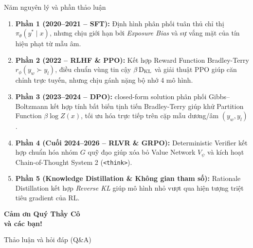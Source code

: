 \begin{frame}{Năm nguyên lý và phần thảo luận}
  \footnotesize
  \begin{enumerate}\setlength{\itemsep}{4pt}
    \item \textbf{Phần 1 (2020--2021 -- SFT):} Định hình phân phối tuân thủ chỉ thị $\pi_\theta(y^* \mid x)$, nhưng chịu giới hạn bởi \textit{Exposure Bias} và sự vắng mặt của tín hiệu phạt từ mẫu âm.
    \item \textbf{Phần 2 (2022 -- RLHF \& PPO):} Kết hợp Reward Function Bradley-Terry $r_\phi(y_w \succ y_l)$, điều chuẩn vùng tin cậy $\beta \operatorname{D_{\mathrm{KL}}}$ và giải thuật PPO giúp căn chỉnh trực tuyến, nhưng chịu gánh nặng bộ nhớ 4 mô hình.
    \item \textbf{Phần 3 (2023--2024 -- DPO):} closed-form solution phân phối Gibbs--Boltzmann kết hợp tính bất biến tịnh tiến Bradley-Terry giúp khử Partition Function $\beta \log Z(x)$, tối ưu hóa trực tiếp trên cặp mẫu dương/âm $(y_w, y_l)$.
    \item \textbf{Phần 4 (Cuối 2024--2026 -- RLVR \& GRPO):} Deterministic Verifier kết hợp chuẩn hóa nhóm $G$ quỹ đạo giúp xóa bỏ Value Network $V_\psi$ và kích hoạt Chain-of-Thought System 2 (\texttt{<think>}).
    \item \textbf{Phần 5 (Knowledge Distillation \& Không gian tham số):} Rationale Distillation kết hợp \textit{Reverse KL} giúp mô hình nhỏ vượt qua hiện tượng triệt tiêu gradient của RL.
  \end{enumerate}
  \par\vspace{0pt}
\end{frame}

\begin{frame}[plain]
  \begin{center}
    {\LARGE\bfseries\color{refblue}Cảm ơn Quý Thầy Cô\\và các bạn!\par}
    \vspace{0.5cm}
    {\large Thảo luận và hỏi đáp (Q\&A)}
  \end{center}
\end{frame}
